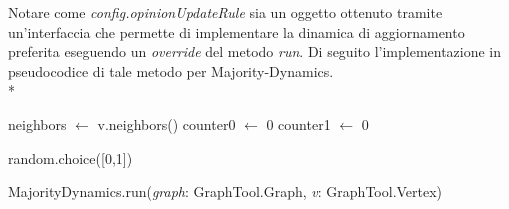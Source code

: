 \documentclass[../Tesi.tex]{subfiles}
\begin{document}
\hfill \break

Notare come \emph{config.opinionUpdateRule} sia un oggetto ottenuto tramite un'interfaccia che permette di implementare la dinamica di aggiornamento preferita eseguendo un \emph{override} del metodo \emph{run}. Di seguito l'implementazione in pseudocodice di tale metodo per Majority-Dynamics.\\*

\begin{algorithm}[H]
  neighbors $\gets$ v.neighbors()\;
  counter0 $\gets$ 0\;
  counter1 $\gets$ 0\;
  
  
  \Return random.choice([0,1])\;
\caption{MajorityDynamics.run(\emph{graph}: GraphTool.Graph, \emph{v}: GraphTool.Vertex)}
\end{algorithm}
\end{document}
